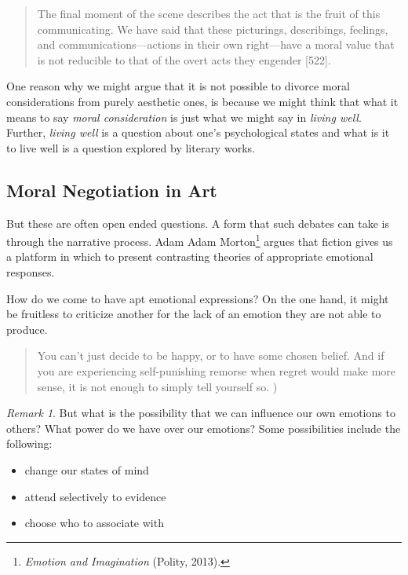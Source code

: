 \documentclass[
  12pt,
]{book}
\providecommand{\tightlist}{%
  \setlength{\itemsep}{0pt}\setlength{\parskip}{0pt}}
\providecommand{\tightlist}{%
  \setlength{\itemsep}{0pt}\setlength{\parskip}{0pt}}
\theoremstyle{definition}
\theoremstyle{definition}
\theoremstyle{definition}
\theoremstyle{definition}
\theoremstyle{remark}
\newtheorem*{remark}{Remark}
\begin{document}
\begin{quote}
The final moment of the scene describes the act that is the fruit of this communicating. We have said that these picturings, describings, feelings, and communications---actions in their own right---have a moral value that is not reducible to that of the overt acts they engender {[}522{]}.
\end{quote}

One reason why we might argue that it is not possible to divorce moral considerations from purely aesthetic ones, is because we might think that what it means to say \emph{moral consideration} is just what we might say in \emph{living well}. Further, \emph{living well} is a question about one's psychological states and what is it to live well is a question explored by literary works.

\subsection*{Moral Negotiation in Art}\label{moral-negotiation-in-art}

But these are often open ended questions. A form that such debates can take is through the narrative process. Adam Adam Morton\footnote{\emph{Emotion and {Imagination}} (Polity, 2013).} argues that fiction gives us a platform in which to present contrasting theories of appropriate emotional responses.

How do we come to have apt emotional expressions? On the one hand, it might be fruitless to criticize another for the lack of an emotion they are not able to produce.

\begin{quote}
You can't just decide to be happy, or to have some chosen belief. And if you are experiencing self-punishing remorse when regret would make more sense, it is not enough to simply tell yourself so. )
\end{quote}

\begin{remark}

But what is the possibility that we can influence our own emotions to others? What power do we have over our emotions? Some possibilities include the following:

\begin{itemize}
\tightlist
\item
  change our states of mind
\item
  attend selectively to evidence
\item
  choose who to associate with
\end{itemize}

\end{remark}
\end{document}
